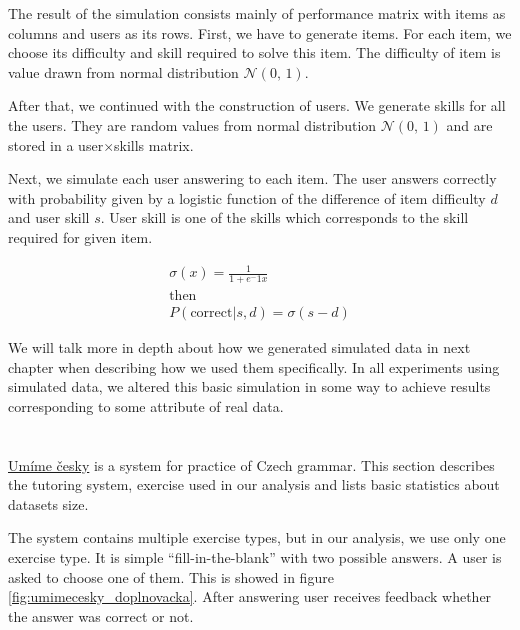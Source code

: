 \documentclass[
  digital, %
  table,   %
  nolof,     %
  nolot,     %
  nocover,
  color,
  final, %
]{fithesis3}
\begin{document}
The result of the simulation consists mainly of performance matrix with items as columns and users as its rows. First, we have to generate items. For each item, we choose its difficulty and skill required to solve this item. The difficulty of item is value drawn from normal distribution $\mathcal{N}(0,\,1)$.

After that, we continued with the construction of users. We generate skills for all the users. They are random values from normal distribution $\mathcal{N}(0,\,1)$ and are stored in a user$\times$skills matrix.

Next, we simulate each user answering to each item. The user answers correctly with probability given by a logistic function of the difference of item difficulty $d$ and user skill $s$. User skill is one of the skills which corresponds to the skill required for given item.

\begin{gather*}
\sigma(x) = \frac{1}{1 + e^-1x} \\
\text{then}\\
P(\text{correct}|s, d) = \sigma(s - d)
\end{gather*}


We will talk more in depth about how we generated simulated data in next chapter when describing how we used them specifically. In all experiments using simulated data, we altered this basic simulation in some way to achieve results corresponding to some attribute of real data.


\section{\umimeCesky{}}\label{umime-cesky}


\href{https://umimecesky.cz/}{Umíme česky} is a system for practice of Czech grammar. This section describes the tutoring system, exercise used in our analysis and lists basic statistics about datasets size.

The system contains multiple exercise types, but in our analysis, we use only one exercise type. It is simple ``fill-in-the-blank'' with two possible answers. A user is asked to choose one of them. This is showed in figure \ref{fig:umimecesky_doplnovacka}. After answering user receives feedback whether the answer was correct or not.
\end{document}
